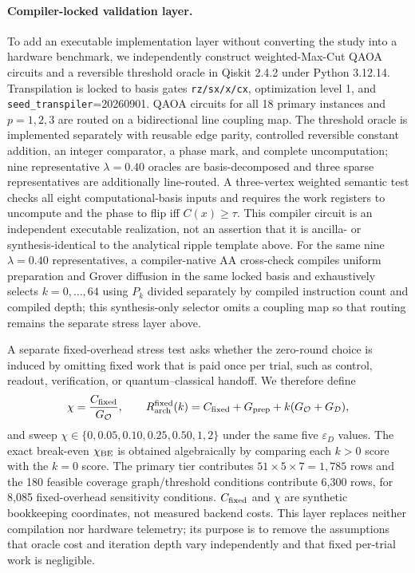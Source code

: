 \documentclass[5p,times]{elsarticle}
\begin{document}
\paragraph{Compiler-locked validation layer.}
To add an executable implementation layer without converting the study into a hardware benchmark, we independently construct weighted-Max-Cut QAOA circuits and a reversible threshold oracle in Qiskit 2.4.2 under Python 3.12.14. Transpilation is locked to basis gates \texttt{rz/sx/x/cx}, optimization level 1, and \texttt{seed\_transpiler}=20260901. QAOA circuits for all 18 primary instances and $p=1,2,3$ are routed on a bidirectional line coupling map. The threshold oracle is implemented separately with reusable edge parity, controlled reversible constant addition, an integer comparator, a phase mark, and complete uncomputation; nine representative $\lambda=0.40$ oracles are basis-decomposed and three sparse representatives are additionally line-routed. A three-vertex weighted semantic test checks all eight computational-basis inputs and requires the work registers to uncompute and the phase to flip iff $C(x)\geq\tau$. This compiler circuit is an independent executable realization, not an assertion that it is ancilla- or synthesis-identical to the analytical ripple template above. For the same nine $\lambda=0.40$ representatives, a compiler-native AA cross-check compiles uniform preparation and Grover diffusion in the same locked basis and exhaustively selects $k=0,\ldots,64$ using $P_k$ divided separately by compiled instruction count and compiled depth; this synthesis-only selector omits a coupling map so that routing remains the separate stress layer above.

A separate fixed-overhead stress test asks whether the zero-round choice is induced by omitting fixed work that is paid once per trial, such as control, readout, verification, or quantum--classical handoff. We therefore define
\begin{equation}
\chi=\frac{C_{\rm fixed}}{G_{\mathcal O}},
\qquad
R_{\rm arch}^{\rm fixed}(k)=C_{\rm fixed}+G_{\rm prep}+k(G_{\mathcal O}+G_{\mathcal D}),
\end{equation}
and sweep $\chi\in\{0,0.05,0.10,0.25,0.50,1,2\}$ under the same five $\varepsilon_D$ values. The exact break-even $\chi_{\rm BE}$ is obtained algebraically by comparing each $k>0$ score with the $k=0$ score. The primary tier contributes $51\times5\times7=1{,}785$ rows and the 180 feasible coverage graph/threshold conditions contribute 6,300 rows, for 8,085 fixed-overhead sensitivity conditions. $C_{\rm fixed}$ and $\chi$ are synthetic bookkeeping coordinates, not measured backend costs. This layer replaces neither compilation nor hardware telemetry; its purpose is to remove the assumptions that oracle cost and iteration depth vary independently and that fixed per-trial work is negligible.
\end{document}
